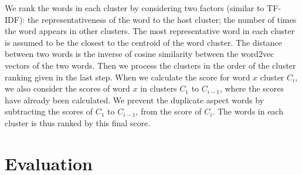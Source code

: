 \documentclass[10pt,final,conference,letterpaper]{IEEEtran}
\begin{document}
We rank the words in each cluster 
by considering two factors (similar to TF-IDF): 
the representativeness of the word to the host
cluster; the number of times the word appears in other clusters. 
The most representative word in each cluster
is assumed to be the closest to the centroid of the word cluster.
The distance between two words is the inverse of 
cosine similarity between the word2vec
vectors of the two words.
Then we process the clusters in the order of 
the cluster ranking given in the last step.
When we calculate the score for word $x$ cluster $C_i$,
we also consider the scores of word $x$ in clusters $C_1$ to $C_{i-1}$, 
where the scores have already been calculated. 
We prevent the duplicate aspect words by subtracting the scores 
of $C_1$ to $C_{i-1}$, from the score of $C_i$.
%
The words in each cluster is thus ranked by this final score.

\section{Evaluation}
\label{sec:experiments}
\end{document}

